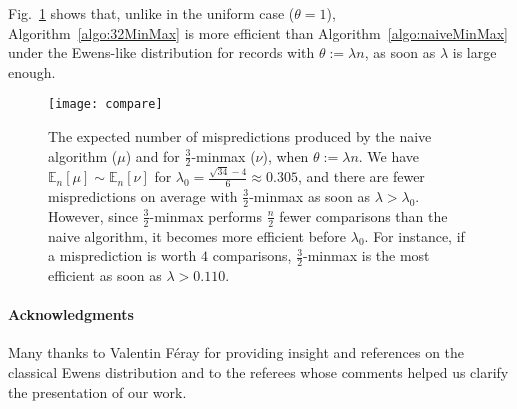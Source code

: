 \documentclass[proceedings]{aofa}
\newcommand{\EE}{\mathbb{E}}
\begin{document}
Fig.~\ref{fig:compare} shows that, unlike in the uniform case ($\theta=1$), Algorithm~\ref{algo:32MinMax} is more efficient than Algorithm~\ref{algo:naiveMinMax} 
under the Ewens-like distribution for records with $\theta:=\lambda n$, as soon as $\lambda$ is large enough.
\begin{figure}[ht]
\begin{minipage}{.35\textwidth}
\vspace*{0.5em}
\texttt{[image: compare]}
\end{minipage}
\begin{minipage}{.63\textwidth}
\caption{The expected number of mispredictions produced by the naive algorithm ($\mu$) and for $\frac32$-minmax ($\nu$), when $\theta:=\lambda n$. We have
$\EE_{n}[\mu] \sim \EE_{n}[\nu]$ for $\lambda_{0}=\frac{\sqrt{34}-4}6\approx 0.305$, 
and there are fewer mispredictions on average with $\frac32$-minmax as soon as $\lambda > \lambda_{0}$.
However, since $\frac32$-minmax performs $\frac{n}2$ fewer comparisons than the naive algorithm, it becomes more efficient before $\lambda_{0}$. 
For instance, if a misprediction is worth $4$ comparisons, $\frac32$-minmax is the most efficient as soon as $\lambda>0.110$.\label{fig:compare}}
\end{minipage}
\end{figure}


\paragraph{Acknowledgments} Many thanks to Valentin Féray for providing insight and references on the classical Ewens distribution and to the referees whose comments helped us clarify the presentation of our work.


\begin{small}

\end{small}
\end{document}
